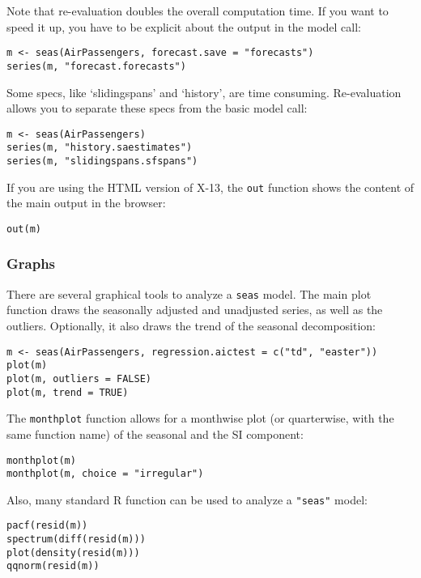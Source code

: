 Note that re-evaluation doubles the overall computation time. If you
want to speed it up, you have to be explicit about the output in the
model call:

\begin{verbatim}
m <- seas(AirPassengers, forecast.save = "forecasts")
series(m, "forecast.forecasts")
\end{verbatim}

Some specs, like `slidingspans' and `history', are time consuming.
Re-evaluation allows you to separate these specs from the basic model
call:

\begin{verbatim}
m <- seas(AirPassengers)
series(m, "history.saestimates")
series(m, "slidingspans.sfspans")
\end{verbatim}

If you are using the HTML version of X-13, the \texttt{out} function
shows the content of the main output in the browser:

\begin{verbatim}
out(m)
\end{verbatim}

\subsubsection{Graphs}\label{graphs}

There are several graphical tools to analyze a \texttt{seas} model. The
main plot function draws the seasonally adjusted and unadjusted series,
as well as the outliers. Optionally, it also draws the trend of the
seasonal decomposition:

\begin{verbatim}
m <- seas(AirPassengers, regression.aictest = c("td", "easter"))
plot(m)
plot(m, outliers = FALSE)
plot(m, trend = TRUE)
\end{verbatim}

The \texttt{monthplot} function allows for a monthwise plot (or
quarterwise, with the same function name) of the seasonal and the SI
component:

\begin{verbatim}
monthplot(m)
monthplot(m, choice = "irregular")
\end{verbatim}

Also, many standard R function can be used to analyze a \texttt{"seas"}
model:

\begin{verbatim}
pacf(resid(m))
spectrum(diff(resid(m)))
plot(density(resid(m)))
qqnorm(resid(m))
\end{verbatim}

